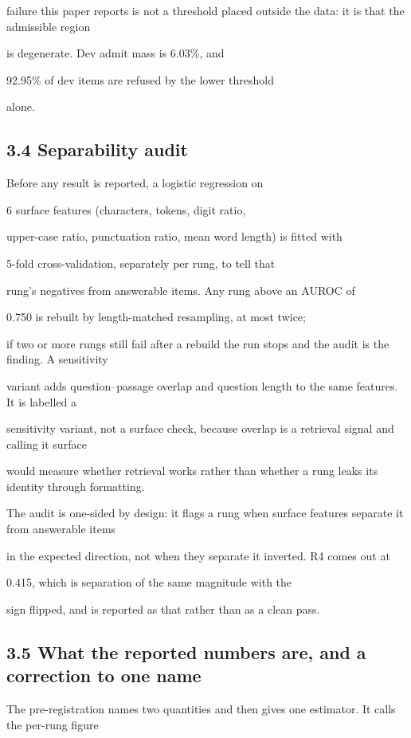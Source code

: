 failure this paper reports is not a threshold placed outside the data: it is that the admissible region

is degenerate. Dev admit mass is 6.03\%, and

92.95\% of dev items are refused by the lower threshold

alone.

\subsection{3.4 Separability audit}
Before any result is reported, a logistic regression on

6 surface features (characters, tokens, digit ratio,

upper-case ratio, punctuation ratio, mean word length) is fitted with

5-fold cross-validation, separately per rung, to tell that

rung's negatives from answerable items. Any rung above an AUROC of

0.750 is rebuilt by length-matched resampling, at most twice;

if two or more rungs still fail after a rebuild the run stops and the audit is the finding. A sensitivity

variant adds question--passage overlap and question length to the same features. It is labelled a

sensitivity variant, not a surface check, because overlap is a retrieval signal and calling it surface

would measure whether retrieval works rather than whether a rung leaks its identity through formatting.

The audit is one-sided by design: it flags a rung when surface features separate it from answerable items

in the expected direction, not when they separate it inverted. R4 comes out at

0.415, which is separation of the same magnitude with the

sign flipped, and is reported as that rather than as a clean pass.

\subsection{3.5 What the reported numbers are, and a correction to one name}
The pre-registration names two quantities and then gives one estimator. It calls the per-rung figure

